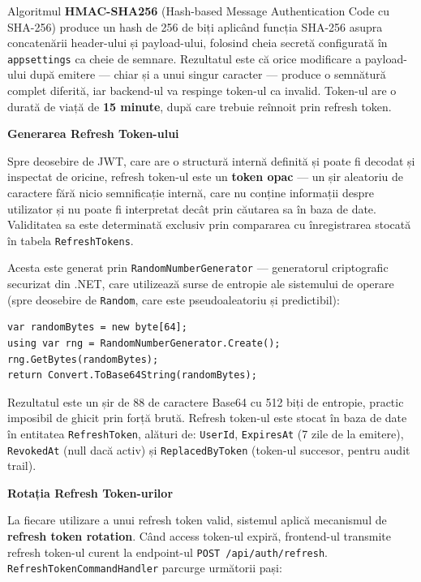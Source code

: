 \documentclass[12pt, a4paper]{report}
\begin{document}
Algoritmul \textbf{HMAC-SHA256} (Hash-based Message Authentication Code cu SHA-256)
produce un hash de 256 de biți aplicând funcția SHA-256 asupra concatenării
header-ului și payload-ului, folosind cheia secretă configurată în
\texttt{appsettings} ca cheie de semnare. Rezultatul este că orice modificare
a payload-ului după emitere --- chiar și a unui singur caracter --- produce o
semnătură complet diferită, iar backend-ul va respinge token-ul ca invalid.
Token-ul are o durată de viață de \textbf{15 minute}, după care trebuie reînnoit
prin refresh token.


\textbf{Generarea Refresh Token-ului}

Spre deosebire de JWT, care are o structură internă definită și poate fi decodat și
inspectat de oricine, refresh token-ul este un \textbf{token opac} --- un șir aleatoriu
de caractere fără nicio semnificație internă, care nu conține informații despre utilizator
și nu poate fi interpretat decât prin căutarea sa în baza de date. Validitatea sa este
determinată exclusiv prin compararea cu înregistrarea stocată în tabela
\texttt{RefreshTokens}.

Acesta este generat prin \texttt{RandomNumberGenerator} --- generatorul criptografic
securizat din .NET, care utilizează surse de entropie ale sistemului de operare (spre
deosebire de \texttt{Random}, care este pseudoaleatoriu și predictibil):


\begin{verbatim}
var randomBytes = new byte[64];
using var rng = RandomNumberGenerator.Create();
rng.GetBytes(randomBytes);
return Convert.ToBase64String(randomBytes);
\end{verbatim}

Rezultatul este un șir de 88 de caractere Base64 cu 512 biți de entropie, practic
imposibil de ghicit prin forță brută. Refresh token-ul este stocat în baza de date
în entitatea \texttt{RefreshToken}, alături de: \texttt{UserId}, \texttt{ExpiresAt}
(7 zile de la emitere), \texttt{RevokedAt} (null dacă activ) și \texttt{ReplacedByToken}
(token-ul succesor, pentru audit trail).

\textbf{Rotația Refresh Token-urilor}

La fiecare utilizare a unui refresh token valid, sistemul aplică mecanismul de
\textbf{refresh token rotation}. Când access token-ul expiră, frontend-ul transmite
refresh token-ul curent la endpoint-ul \texttt{POST /api/auth/refresh}.
\texttt{RefreshTokenCommandHandler} parcurge următorii pași:
\end{document}
